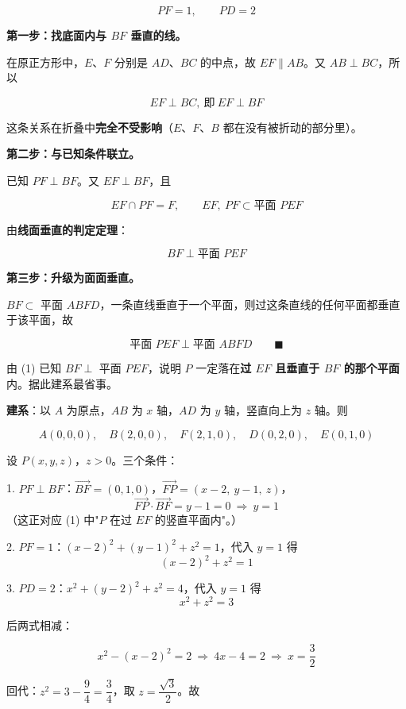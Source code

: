 \[PF=1,\qquad PD=2\]


\textbf{第一步：找底面内与 $BF$ 垂直的线。}

在原正方形中，$E$、$F$ 分别是 $AD$、$BC$ 的中点，故 $EF\parallel AB$。又 $AB\perp BC$，所以

\[EF\perp BC,\ \text{即}\ EF\perp BF\]

这条关系在折叠中\textbf{完全不受影响}（$E$、$F$、$B$ 都在没有被折动的部分里）。

\textbf{第二步：与已知条件联立。}

已知 $PF\perp BF$。又 $EF\perp BF$，且

\[EF\cap PF=F,\qquad EF,\ PF\subset\text{平面 }PEF\]

由\textbf{线面垂直的判定定理}：

\[BF\perp\text{平面 }PEF\]

\textbf{第三步：升级为面面垂直。}

$BF\subset$ 平面 $ABFD$，一条直线垂直于一个平面，则过这条直线的任何平面都垂直于该平面，故

\[\text{平面 }PEF\perp\text{平面 }ABFD\qquad\blacksquare\]


由 (1) 已知 $BF\perp$ 平面 $PEF$，说明 $P$ 一定落在\textbf{过 $EF$ 且垂直于 $BF$ 的那个平面}内。据此建系最省事。

\textbf{建系}：以 $A$ 为原点，$AB$ 为 $x$ 轴，$AD$ 为 $y$ 轴，竖直向上为 $z$ 轴。则

\[A(0,0,0),\quad B(2,0,0),\quad F(2,1,0),\quad D(0,2,0),\quad E(0,1,0)\]

设 $P(x,y,z)$，$z>0$。三个条件：

1. \textbf{$PF\perp BF$}：$\overrightarrow{BF}=(0,1,0)$，$\overrightarrow{FP}=(x-2,\ y-1,\ z)$，
\[\overrightarrow{FP}\cdot\overrightarrow{BF}=y-1=0\ \Longrightarrow\ y=1\]
   （这正对应 (1) 中"$P$ 在过 $EF$ 的竖直平面内"。）

2. \textbf{$PF=1$}：$(x-2)^{2}+(y-1)^{2}+z^{2}=1$，代入 $y=1$ 得
\[(x-2)^{2}+z^{2}=1\]

3. \textbf{$PD=2$}：$x^{2}+(y-2)^{2}+z^{2}=4$，代入 $y=1$ 得
\[x^{2}+z^{2}=3\]

后两式相减：

\[x^{2}-(x-2)^{2}=2\ \Longrightarrow\ 4x-4=2\ \Longrightarrow\ x=\frac32\]

回代：$z^{2}=3-\dfrac94=\dfrac34$，取 $z=\dfrac{\sqrt3}2$。故

